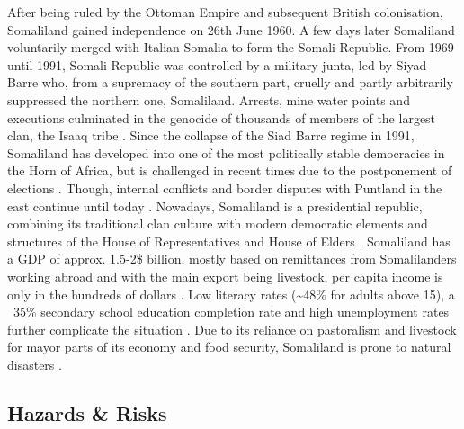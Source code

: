 After being ruled by the Ottoman Empire and subsequent British colonisation, Somaliland gained independence on 26th June 1960. A few days later Somaliland voluntarily merged with Italian Somalia to form the Somali Republic. From 1969 until 1991, Somali Republic was controlled by a military junta, led by Siyad Barre who, from a supremacy of the southern part, cruelly and partly arbitrarily suppressed the northern one, Somaliland. Arrests, mine water points and executions culminated in the genocide of thousands of members of the largest clan, the Isaaq tribe \autocite{peiferStoppingMassKillings2009,republicofsomaliaRepublicSomalilandCountry2021}. Since the collapse of the Siad Barre regime in 1991, Somaliland has developed into one of the most politically stable democracies in the Horn of Africa, but is challenged in recent times due to the postponement of elections \autocite{bbcSomalilandProfile2022, fortiPocketStabilityUnderstanding2011}. Though, internal conflicts and border disputes with Puntland in the east continue until today \autocite{filhoDEMOCRACYAFRICAOUTSTANDING2021}. Nowadays, Somaliland is a presidential republic, combining its traditional clan culture with modern democratic elements and structures of the House of Representatives and House of Elders \autocite{salemTerritorialDiagnosticReport2016}.\newline
Somaliland has a GDP of approx. 1.5-2\$ billion, mostly based on remittances from Somalilanders working abroad and with the main export being livestock, per capita income is only in the hundreds of dollars \autocite{klobucistaSomalilandHornAfrica2018, republicofsomaliaRepublicSomalilandCountry2021, worldbankNewWorldBank2014}. Low literacy rates (\~{}48\% for adults above 15), a ~35\% secondary school education completion rate and high unemployment rates further complicate the situation \autocite{republicofsomaliaRepublicSomalilandCountry2021,worldbankNewWorldBank2014}. Due to its reliance on pastoralism and livestock for mayor parts of its economy and food security, Somaliland is prone to natural disasters \autocite{usaidEconomicsResilienceDrought2018}.


\subsection{Hazards \& Risks}

